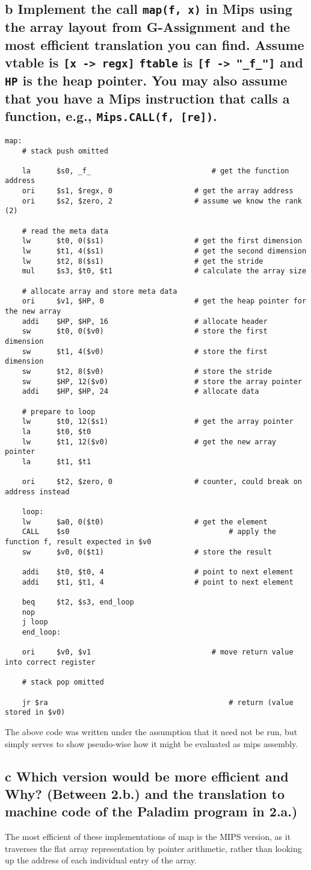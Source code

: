 \documentclass[11pt,a4paper]{article}
\begin{document}
\subsection*{b \mdseries Implement the call {\tt map(f, x)} in Mips using the
array layout from G-Assignment and the most efficient translation you can
find. Assume vtable is {\tt [x -> regx]}
{\tt ftable} is {\tt [f -> "\_f\_"]} and {\tt HP} is the heap pointer. You may
also assume that you have a Mips instruction that calls a function, e.g.,
{\tt Mips.CALL(f, [re])}.}
\begin{lstlisting}
map:
	# stack push omitted

	la		$s0, _f_							# get the function address
	ori		$s1, $regx, 0					# get the array address
	ori		$s2, $zero, 2					# assume we know the rank (2)

	# read the meta data
	lw		$t0, 0($s1)						# get the first dimension
	lw		$t1, 4($s1)						# get the second dimension
	lw		$t2, 8($s1)						# get the stride
	mul		$s3, $t0, $t1					# calculate the array size

	# allocate array and store meta data
	ori		$v1, $HP, 0						# get the heap pointer for the new array
	addi	$HP, $HP, 16					# allocate header
	sw		$t0, 0($v0)						# store the first dimension
	sw		$t1, 4($v0)						# store the first dimension
	sw		$t2, 8($v0)						# store the stride
	sw		$HP, 12($v0)					# store the array pointer
	addi	$HP, $HP, 24					# allocate data

	# prepare to loop
	lw		$t0, 12($s1)					# get the array pointer
	la 		$t0, $t0
	lw 		$t1, 12($v0)					# get the new array pointer
	la 		$t1, $t1

	ori		$t2, $zero, 0					# counter, could break on address instead

	loop:
	lw		$a0, 0($t0)						# get the element
	CALL	$s0										# apply the function f, result expected in $v0
	sw		$v0, 0($t1)						# store the result

	addi	$t0, $t0, 4						# point to next element
	addi	$t1, $t1, 4						# point to next element

	beq		$t2, $s3, end_loop
	nop
	j loop
	end_loop:

	ori		$v0, $v1							# move return value into correct register
	
	# stack pop omitted
	
	jr $ra											# return (value stored in $v0)

\end{lstlisting}
The above code was written under the assumption that it need not be run, but
simply serves to show pseudo-wise how it might be evaluated as mips assembly.

\subsection*{c \mdseries Which version would be more efficient and Why?
(Between 2.b.) and the translation to machine code of the Paladim program in
2.a.)}
The most efficient of these implementations of map is the MIPS version, as it
traverses the flat array representation by pointer arithmetic, rather than
looking up the address of each individual entry of the array.
\end{document}
